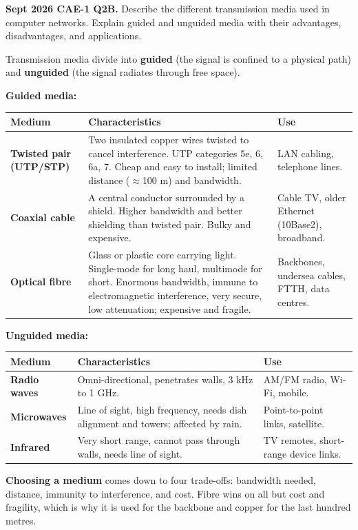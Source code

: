 \documentclass[11pt,a4paper]{article}
\begin{document}
\begin{pyqbox}
\textbf{Sept 2026 CAE-1 Q2B.} Describe the different transmission media used in computer networks. Explain guided and unguided media with their advantages, disadvantages, and applications.
\end{pyqbox}

\begin{solbox}
Transmission media divide into \textbf{guided} (the signal is confined to a physical path) and \textbf{unguided} (the signal radiates through free space).

\textbf{Guided media:}

\begin{center}\small
\begin{tabularx}{\textwidth}{>{\bfseries}p{} X p{}}
\toprule Medium & Characteristics & Use\\
\midrule
Twisted pair (UTP/STP) & Two insulated copper wires twisted to cancel interference. UTP categories 5e, 6, 6a, 7. Cheap and easy to install; limited distance ($\approx$100 m) and bandwidth. & LAN cabling, telephone lines.\\
Coaxial cable & A central conductor surrounded by a shield. Higher bandwidth and better shielding than twisted pair. Bulky and expensive. & Cable TV, older Ethernet (10Base2), broadband.\\
Optical fibre & Glass or plastic core carrying light. Single-mode for long haul, multimode for short. Enormous bandwidth, immune to electromagnetic interference, very secure, low attenuation; expensive and fragile. & Backbones, undersea cables, FTTH, data centres.\\
\bottomrule
\end{tabularx}
\end{center}

\textbf{Unguided media:}

\begin{center}\small
\begin{tabularx}{\textwidth}{>{\bfseries}p{} X p{}}
\toprule Medium & Characteristics & Use\\
\midrule
Radio waves & Omni-directional, penetrates walls, 3 kHz to 1 GHz. & AM/FM radio, Wi-Fi, mobile.\\
Microwaves & Line of sight, high frequency, needs dish alignment and towers; affected by rain. & Point-to-point links, satellite.\\
Infrared & Very short range, cannot pass through walls, needs line of sight. & TV remotes, short-range device links.\\
\bottomrule
\end{tabularx}
\end{center}

\textbf{Choosing a medium} comes down to four trade-offs: bandwidth needed, distance, immunity to interference, and cost. Fibre wins on all but cost and fragility, which is why it is used for the backbone and copper for the last hundred metres.
\end{solbox}
\end{document}

